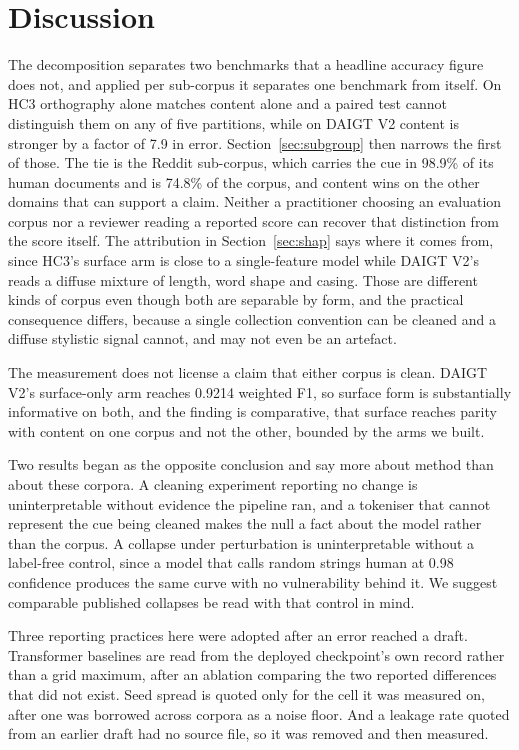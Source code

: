 \section{Discussion}
\label{sec:limits}

The decomposition separates two benchmarks that a headline accuracy figure does not, and applied per sub-corpus it separates one benchmark from itself. On HC3 orthography alone matches content alone and a paired test cannot distinguish them on any of five partitions, while on DAIGT V2 content is stronger by a factor of 7.9 in error. Section~\ref{sec:subgroup} then narrows the first of those. The tie is the Reddit sub-corpus, which carries the cue in 98.9\% of its human documents and is 74.8\% of the corpus, and content wins on the other domains that can support a claim. Neither a practitioner choosing an evaluation corpus nor a reviewer reading a reported score can recover that distinction from the score itself. The attribution in Section~\ref{sec:shap} says where it comes from, since HC3's surface arm is close to a single-feature model while DAIGT V2's reads a diffuse mixture of length, word shape and casing. Those are different kinds of corpus even though both are separable by form, and the practical consequence differs, because a single collection convention can be cleaned and a diffuse stylistic signal cannot, and may not even be an artefact.

The measurement does not license a claim that either corpus is clean. DAIGT V2's surface-only arm reaches 0.9214 weighted F1, so surface form is substantially informative on both, and the finding is comparative, that surface reaches parity with content on one corpus and not the other, bounded by the arms we built.

Two results began as the opposite conclusion and say more about method than about these corpora. A cleaning experiment reporting no change is uninterpretable without evidence the pipeline ran, and a tokeniser that cannot represent the cue being cleaned makes the null a fact about the model rather than the corpus. A collapse under perturbation is uninterpretable without a label-free control, since a model that calls random strings human at 0.98 confidence produces the same curve with no vulnerability behind it. We suggest comparable published collapses be read with that control in mind.

Three reporting practices here were adopted after an error reached a draft. Transformer baselines are read from the deployed checkpoint's own record rather than a grid maximum, after an ablation comparing the two reported differences that did not exist. Seed spread is quoted only for the cell it was measured on, after one was borrowed across corpora as a noise floor. And a leakage rate quoted from an earlier draft had no source file, so it was removed and then measured.

